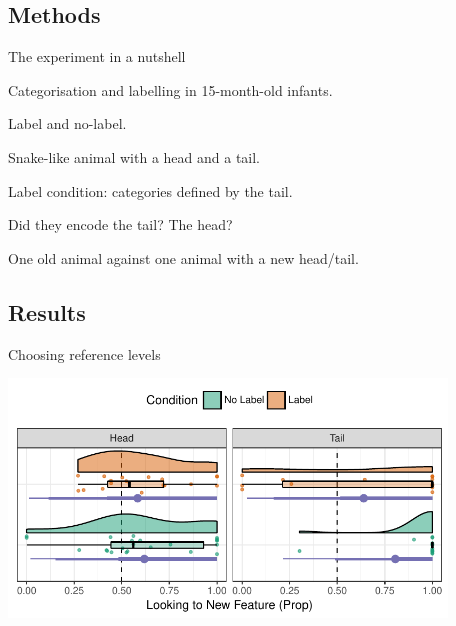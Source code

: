 \documentclass{beamer}
\begin{document}
\subsection{Methods}

\begin{frame}{The experiment in a nutshell}

  Categorisation and labelling in 15-month-old infants.
  \vspace{2em}
  \begin{description}
    \pause\item[\hspace{37.5pt}Conditions] Label and no-label.
    \pause\item[\hspace{20pt}Familiarisation] Snake-like animal with a head and a tail.
    
    Label condition: categories defined by the tail.
    \pause\item[Novelty Preference] Did they encode the tail? The head?
    
    One old animal against one animal with a new head/tail.
  \end{description}

\end{frame}

\subsection{Results}

\begin{frame}{Choosing reference levels}

  \begin{center}
    \includegraphics[height=2.5in]{SalDi-old_new.pdf}
  \end{center}

\end{frame}
\end{document}
